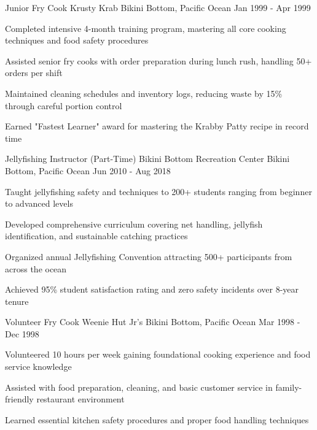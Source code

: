 \begin{cventries}
  \cventry
    {Junior Fry Cook} %
    {Krusty Krab} %
    {Bikini Bottom, Pacific Ocean} %
    {Jan 1999 - Apr 1999} %
    {
      \begin{cvitems}
        \item {Completed intensive 4-month training program, mastering all core cooking techniques and food safety procedures}
        \item {Assisted senior fry cooks with order preparation during lunch rush, handling 50+ orders per shift}
        \item {Maintained cleaning schedules and inventory logs, reducing waste by 15\% through careful portion control}
        \item {Earned "Fastest Learner" award for mastering the Krabby Patty recipe in record time}
      \end{cvitems}
    }

  \cventry
    {Jellyfishing Instructor (Part-Time)} %
    {Bikini Bottom Recreation Center} %
    {Bikini Bottom, Pacific Ocean} %
    {Jun 2010 - Aug 2018} %
    {
      \begin{cvitems}
        \item {Taught jellyfishing safety and techniques to 200+ students ranging from beginner to advanced levels}
        \item {Developed comprehensive curriculum covering net handling, jellyfish identification, and sustainable catching practices}
        \item {Organized annual Jellyfishing Convention attracting 500+ participants from across the ocean}
        \item {Achieved 95\% student satisfaction rating and zero safety incidents over 8-year tenure}
      \end{cvitems}
    }

  \cventry
    {Volunteer Fry Cook} %
    {Weenie Hut Jr's} %
    {Bikini Bottom, Pacific Ocean} %
    {Mar 1998 - Dec 1998} %
    {
      \begin{cvitems}
        \item {Volunteered 10 hours per week gaining foundational cooking experience and food service knowledge}
        \item {Assisted with food preparation, cleaning, and basic customer service in family-friendly restaurant environment}
        \item {Learned essential kitchen safety procedures and proper food handling techniques}
      \end{cvitems}
    }

\end{cventries}

